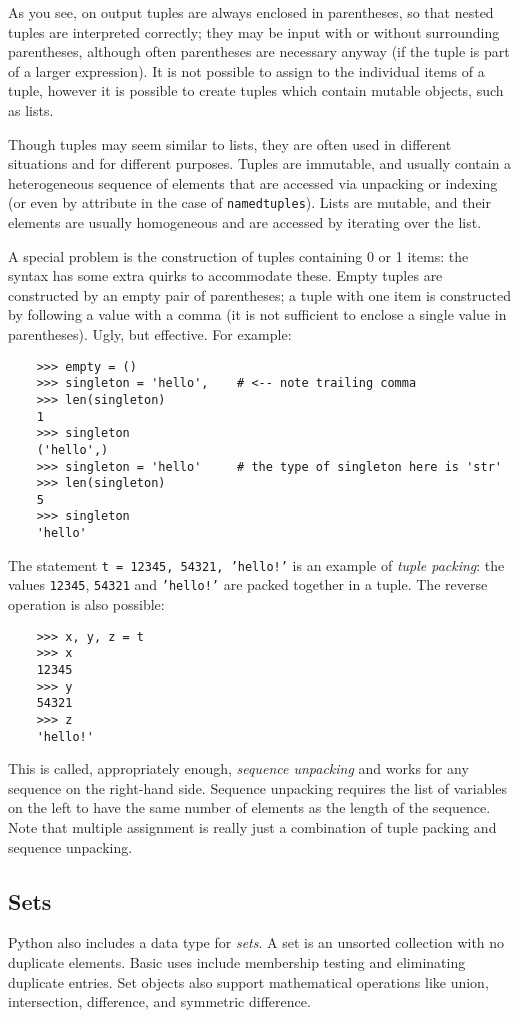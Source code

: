 \documentclass[UTF8]{article}
\begin{document}
As you see, on output tuples are always enclosed in parentheses, so that nested tuples are
interpreted correctly; they may be input with or without surrounding parentheses, although often
parentheses are necessary anyway (if the tuple is part of a larger expression). It is not possible
to assign to the individual items of a tuple, however it is possible to create tuples which contain
mutable objects, such as lists.

Though tuples may seem similar to lists, they are often used in different situations and for
different purposes. Tuples are immutable, and usually contain a heterogeneous sequence of elements
that are accessed via unpacking or indexing (or even by attribute in the case of
\texttt{namedtuples}). Lists are mutable, and their elements are usually homogeneous and are
accessed by iterating over the list.

A special problem is the construction of tuples containing 0 or 1 items: the syntax has some extra
quirks to accommodate these. Empty tuples are constructed by an empty pair of parentheses; a tuple
with one item is constructed by following a value with a comma (it is not sufficient to enclose a
single value in parentheses). Ugly, but effective. For example:
\begin{verbatim}
    >>> empty = ()
    >>> singleton = 'hello',    # <-- note trailing comma
    >>> len(singleton)
    1
    >>> singleton
    ('hello',)
    >>> singleton = 'hello'     # the type of singleton here is 'str'
    >>> len(singleton)
    5
    >>> singleton
    'hello'
\end{verbatim}

The statement \texttt{t = 12345, 54321, 'hello!'} is an example of \emph{tuple packing}: the values
\texttt{12345}, \texttt{54321} and \texttt{'hello!'} are packed together in a tuple. The reverse
operation is also possible:
\begin{verbatim}
    >>> x, y, z = t
    >>> x
    12345
    >>> y
    54321
    >>> z
    'hello!'
\end{verbatim}

This is called, appropriately enough, \emph{sequence unpacking} and works for any sequence on the
right-hand side. Sequence unpacking requires the list of variables on the left to have the same
number of elements as the length of the sequence. Note that multiple assignment is really just a
combination of tuple packing and sequence unpacking.

\subsection{Sets}
Python also includes a data type for \emph{sets}. A set is an unsorted collection with no duplicate
elements. Basic uses include membership testing and eliminating duplicate entries. Set objects also
support mathematical operations like union, intersection, difference, and symmetric difference.
\end{document}
